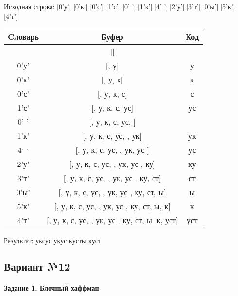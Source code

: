 \documentclass[a4paper, 12pt]{article}
\begin{document}
Исходная строка: [0'у'] [0'к'] [0'с'] [1'с'] [0' '] [1'к'] [4' '] [2'у'] [3'т'] [0'ы'] [5'к'] [4'т']\\
\begin{table}[h!]
\centering
\begin{tabular}{|c|c|c|}
\hline
 Cловарь & Буфер & Код  \\ \hline
 & [] & 
\\ \hline
0'у' & [, у] & у
\\ \hline
0'к' & [, у, к] & к
\\ \hline
0'с' & [, у, к, с] & с
\\ \hline
1'с' & [, у, к, с, ус] & ус
\\ \hline
0' ' & [, у, к, с, ус,  ] &  
\\ \hline
1'к' & [, у, к, с, ус,  , ук] & ук
\\ \hline
4' ' & [, у, к, с, ус,  , ук, ус ] & ус 
\\ \hline
2'у' & [, у, к, с, ус,  , ук, ус , ку] & ку
\\ \hline
3'т' & [, у, к, с, ус,  , ук, ус , ку, ст] & ст
\\ \hline
0'ы' & [, у, к, с, ус,  , ук, ус , ку, ст, ы] & ы
\\ \hline
5'к' & [, у, к, с, ус,  , ук, ус , ку, ст, ы,  к] &  к
\\ \hline
4'т' & [, у, к, с, ус,  , ук, ус , ку, ст, ы,  к, уст] & уст
\\ \hline
\end{tabular}
\end{table}

Результат: уксус укус кусты куст
\pagebreak
\subsection{Вариант №12}
\paragraph{Задание 1. Блочный хаффман \\}
\end{document}
